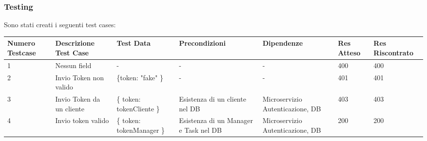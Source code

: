 \documentclass{report}
\begin{document}
\subsubsection*{Testing}

Sono stati creati i seguenti test cases:
\begin{center} %
	\centering
	\begin{tabular}{ |p{1cm}|p{2cm}|p{2cm}|p{2cm}|p{2cm}|p{1cm}|p{1cm}| }
		\hline
		Numero Testcase & Descrizione Test Case & Test Data & Precondizioni & Dipendenze & Res Atteso & Res Riscontrato \\
		\hline
		1 & Nessun field & - & - & - & 400 & 400 \\
		\hline
		2 & Invio Token non valido & \{token: "fake" \} & - & - & 401 & 401 \\
		\hline
		3 & Invio Token da un cliente & \{ token: tokenCliente \} & Esistenza di un cliente nel DB & Microservizio Autenticazione, DB & 403 & 403 \\
		\hline
		4 & Invio token valido & \{ token: tokenManager \} & Esistenza di un Manager e Task nel DB & Microservizio Autenticazione, DB & 200 & 200 \\
		\hline
	\end{tabular}
\end{center}
\end{document}
